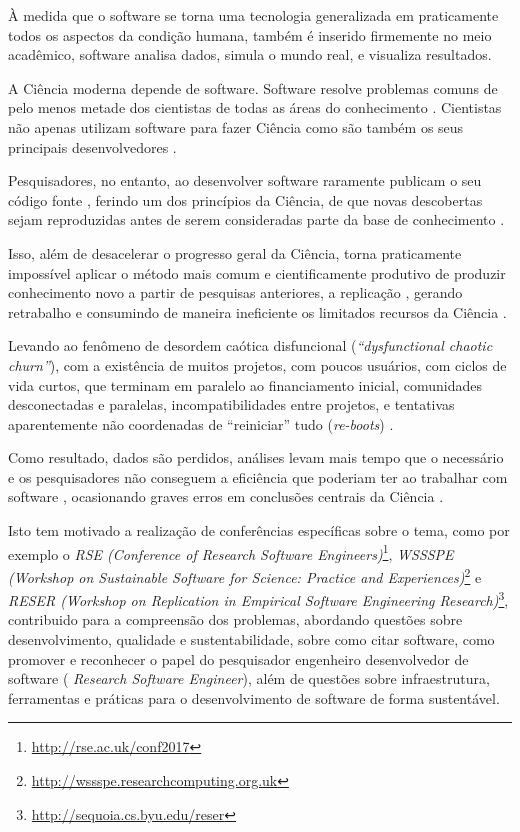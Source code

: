 {À medida que o software se torna uma tecnologia generalizada em praticamente
todos os aspectos da condição humana, também é inserido firmemente no meio
acadêmico, software analisa dados, simula o mundo real, e visualiza
resultados.}
\label{introducao}

A Ciência moderna depende de software. Software resolve problemas comuns de
pelo menos metade dos cientistas de todas as áreas do conhecimento
\cite{wilson2014best}. Cientistas não apenas utilizam software para fazer Ciência como são também
os seus principais desenvolvedores
\cite{goble2014better}.

Pesquisadores, no entanto, ao desenvolver software raramente publicam o
seu código fonte \cite{robles2010replicating, amann2015software}, ferindo um dos
princípios da Ciência, de que novas descobertas sejam reproduzidas antes de
serem consideradas parte da base de conhecimento \cite{stodden2009enabling}.

Isso, além de desacelerar o progresso geral da Ciência, torna praticamente
impossível aplicar o método mais comum e cientificamente produtivo de produzir
conhecimento novo a partir de pesquisas anteriores, a replicação
\cite{king1995replication, stodden2010reproducible}, gerando retrabalho e
consumindo de maneira ineficiente os limitados recursos da Ciência
\cite{howison2013incentives, katz2014transitive}.

Levando ao fenômeno de desordem caótica disfuncional ({\it ``dysfunctional
chaotic churn''}), com a existência de muitos projetos, com poucos
usuários, com ciclos de vida curtos, que terminam em paralelo ao financiamento
inicial, comunidades desconectadas e paralelas, incompatibilidades entre
projetos, e tentativas aparentemente não coordenadas de ``reiniciar'' tudo
({\it re-boots}) \cite{howison2015understanding}.

Como resultado, dados são perdidos,
análises levam mais tempo que o necessário e os pesquisadores não conseguem a
eficiência que poderiam ter ao trabalhar com software
\cite{wilson2017good},
ocasionando graves erros em conclusões centrais da Ciência \cite{merali2010computational}.


Isto tem motivado a realização de conferências específicas sobre o tema,
como por exemplo o {\it RSE (Conference of Research
Software Engineers)}\footnote{ \url{http://rse.ac.uk/conf2017}}, {\it WSSSPE
(Workshop on Sustainable Software for Science: Practice and
Experiences)}\footnote{ \url{http://wssspe.researchcomputing.org.uk}} e {\it
RESER (Workshop on Replication in Empirical Software Engineering
Research)}\footnote{ \url{http://sequoia.cs.byu.edu/reser}}, contribuido para
a compreensão dos problemas, abordando questões sobre desenvolvimento,
qualidade e sustentabilidade, sobre como citar software, como promover e
reconhecer o papel do pesquisador engenheiro desenvolvedor de software ({\it
Research Software Engineer}), além de questões sobre infraestrutura,
ferramentas e práticas para o desenvolvimento de software de forma sustentável.

